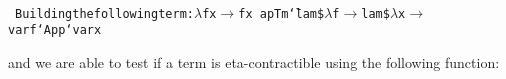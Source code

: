 \documentclass[9pt,authoryear]{sigplanconf}
\begin{document}
%
%
%
~\\~\vphantom{$\{$}\texttt{\makebox[1.22ex][c]{-}\makebox[1.22ex][c]{-}\mbox{\hspace{0.50em}}Building\mbox{\hspace{0.50em}}the\mbox{\hspace{0.50em}}following\mbox{\hspace{0.50em}}term{:}\mbox{\hspace{0.50em}}$ \lambda $\mbox{\hspace{0.50em}}f\mbox{\hspace{0.50em}}x\mbox{\hspace{0.50em}}$ \rightarrow $\mbox{\hspace{0.50em}}f\mbox{\hspace{0.50em}}x}\texttt{{\nopagebreak \newline%
}\vphantom{$\{$}}\texttt{apTm}\texttt{\mbox{\hspace{0.50em}}}\texttt{{\char `\=}}\texttt{\mbox{\hspace{0.50em}}}\texttt{lam}\texttt{\mbox{\hspace{0.50em}}}\texttt{\${}}\texttt{\mbox{\hspace{0.50em}}}\texttt{$ \lambda $}\texttt{\mbox{\hspace{0.50em}}}\texttt{f}\texttt{\mbox{\hspace{0.50em}}}\texttt{$ \rightarrow $}\texttt{\mbox{\hspace{0.50em}}}\texttt{lam}\texttt{\mbox{\hspace{0.50em}}}\texttt{\${}}\texttt{\mbox{\hspace{0.50em}}}\texttt{$ \lambda $}\texttt{\mbox{\hspace{0.50em}}}\texttt{x}\texttt{\mbox{\hspace{0.50em}}}\texttt{$ \rightarrow $}\texttt{\mbox{\hspace{0.50em}}}\texttt{var}\texttt{\mbox{\hspace{0.50em}}}\texttt{f}\texttt{\mbox{\hspace{0.50em}}}\texttt{{`}App{`}}\texttt{\mbox{\hspace{0.50em}}}\texttt{var}\texttt{\mbox{\hspace{0.50em}}}\texttt{x}\texttt{{\nopagebreak \newline%
}\vphantom{$\{$}}%


%
%


%
and we are able to test if a term is eta-contractible using the
    following function{:}%
\end{document}
